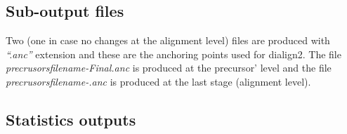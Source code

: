 \documentclass[a4paper,20pt]{report}
\newcommand{\note}{\textcolor{red}}
\begin{document}
\subsection*{Sub-output files}
\noindent
\normalsize
Two (one in case no changes at the alignment level) files are produced with \textit{``.anc''} extension 
and these are the anchoring points used for dialign2. The file \textit{precrusorsfilename-Final.anc} is 
produced at the precursor' level and the file \textit{precrusorsfilename-.anc} is produced at the last 
stage (alignment level).

\subsection{Statistics outputs}
\end{document}
